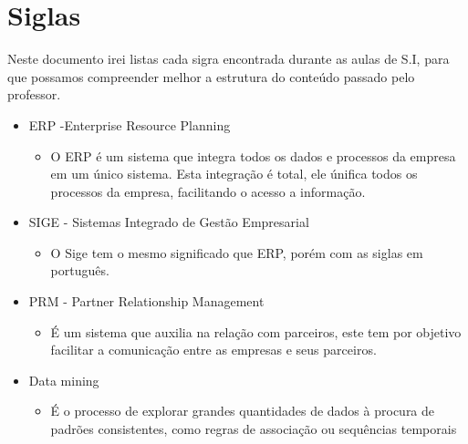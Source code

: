 \documentclass[
	12pt,				%
	openany,			%
	a4paper,			%
	chapter=TITLE,		%
	section=TITLE,		%
	english,
	brazil				%
]{abntex2}
\begin{document}
\imprimircapa

\imprimirfolhaderosto

\tableofcontents

\maketitle

\newpage

\chapter{Siglas}

Neste documento irei listas cada sigra encontrada durante as aulas de S.I, para que possamos compreender melhor a estrutura do conteúdo passado pelo professor.

\begin{itemize}

\item ERP -Enterprise Resource Planning
	\begin{itemize}
		\item[] O ERP é um sistema que integra todos os dados e processos da empresa em um único sistema. Esta integração é total, ele únifica todos os processos da empresa, facilitando o acesso a informação.
	\end{itemize}

\item SIGE - Sistemas Integrado de Gestão Empresarial
	\begin{itemize}
		\item[] O Sige tem o mesmo significado que ERP, porém com as siglas em português.
	\end{itemize}


\item PRM - Partner Relationship Management
	\begin{itemize}
		\item[] É um sistema que auxilia na relação com parceiros, este tem por objetivo facilitar a comunicação entre as empresas e seus parceiros.
	\end{itemize}


\item Data mining
	\begin{itemize}
		\item[] É o processo de explorar grandes quantidades de dados à procura de padrões consistentes, como regras de associação ou sequências temporais
	\end{itemize}



\end{itemize}
\end{document}
